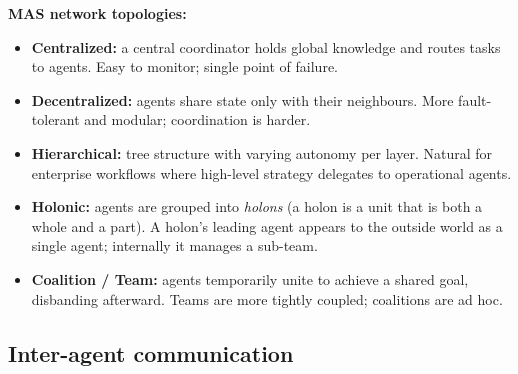 \begin{center}
\end{center}

\textbf{MAS network topologies:}
\begin{itemize}
  \item \textbf{Centralized:} a central coordinator holds global knowledge and routes
    tasks to agents. Easy to monitor; single point of failure.
  \item \textbf{Decentralized:} agents share state only with their neighbours.
    More fault-tolerant and modular; coordination is harder.
  \item \textbf{Hierarchical:} tree structure with varying autonomy per layer.
    Natural for enterprise workflows where high-level strategy delegates to
    operational agents.
  \item \textbf{Holonic:} agents are grouped into \emph{holons} (a holon is a unit
    that is both a whole and a part). A holon's leading agent appears to the outside
    world as a single agent; internally it manages a sub-team.
  \item \textbf{Coalition / Team:} agents temporarily unite to achieve a shared goal,
    disbanding afterward. Teams are more tightly coupled; coalitions are ad hoc.
\end{itemize}

\subsection{Inter-agent communication}

